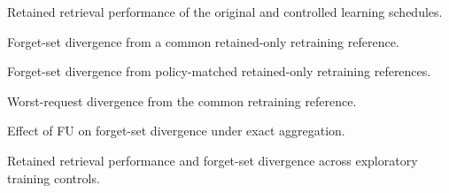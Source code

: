 \caption{Retained retrieval performance of the original and controlled learning schedules.}

\caption{Forget-set divergence from a common retained-only retraining reference.}

\caption{Forget-set divergence from policy-matched retained-only retraining references.}

\caption{Worst-request divergence from the common retraining reference.}

\caption{Effect of FU on forget-set divergence under exact aggregation.}

\caption{Retained retrieval performance and forget-set divergence across exploratory training controls.}
